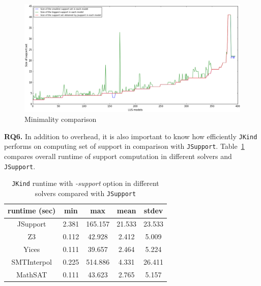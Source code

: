\begin{figure}
  \centering
  \includegraphics[width=\textwidth]{figs/minimality_analyses.png}
  \caption{\small{Minimality comparison}}\label{fig:minjsup}
\end{figure}

\vspace{6pt}
\noindent{}
 \vspace{9pt}
  
 
\textbf{RQ6.} In addition to overhead, it is also important to know how efficiently \texttt{JKind} performs on computing set of support in comparison with \texttt{JSupport}. Table~\ref{tab:eff-comp-jsup} compares overall runtime of support computation in different solvers and \texttt{JSupport}.


\begin{table}
  \centering
  \begin{tabular}{ |c||c|c|c|c| }
    \hline
     runtime (sec) & min & max & mean & stdev \\[0.5ex]
    \hline\hline
    JSupport & 2.381 & 165.157 & 21.533 & 23.533 \\[0.5ex]
    Z3   & 0.112 & 42.928 & 2.412 & 5.009 \\[0.5ex]
    Yices &   0.111  & 39.657   & 2.464 & 5.224 \\[0.5ex]
    SMTInterpol& 0.225 & 514.886 &  4.331 & 26.411 \\[0.5ex]
    MathSAT & 0.111 & 43.623 &  2.765 & 5.157 \\[0.5ex]
    \hline
  \end{tabular}
  \caption{\small{\texttt{JKind} runtime with \emph{-support} option in different solvers compared with \texttt{JSupport}}}
  \label{tab:eff-comp-jsup}
\end{table}


